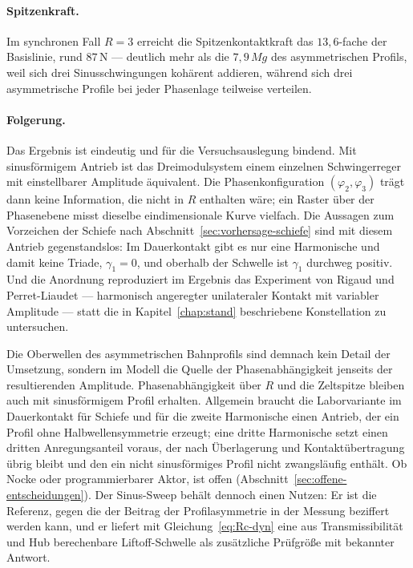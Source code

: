 \documentclass[12pt,a4paper]{report}
\begin{document}
\paragraph{Spitzenkraft.}
Im synchronen Fall $R = 3$ erreicht die Spitzenkontaktkraft das
$13{,}6$-fache der Basislinie, rund $87\,\mathrm{N}$ --- deutlich mehr
als die $7{,}9\,Mg$ des asymmetrischen Profils, weil sich drei
Sinusschwingungen kohärent addieren, während sich drei asymmetrische
Profile bei jeder Phasenlage teilweise verteilen.

\paragraph{Folgerung.}
Das Ergebnis ist eindeutig und für die Versuchsauslegung bindend. Mit
sinusförmigem Antrieb ist das Dreimodulsystem einem einzelnen
Schwingerreger mit einstellbarer Amplitude äquivalent. Die
Phasenkonfiguration $(\varphi_2, \varphi_3)$ trägt dann keine
Information, die nicht in $R$ enthalten wäre; ein Raster über der
Phasenebene misst dieselbe eindimensionale Kurve vielfach. Die
Aussagen zum Vorzeichen der Schiefe nach
Abschnitt~\ref{sec:vorhersage-schiefe} sind mit diesem Antrieb
gegenstandslos: Im Dauerkontakt gibt es nur eine Harmonische und damit
keine Triade, $\gamma_1 = 0$, und oberhalb der Schwelle ist $\gamma_1$
durchweg positiv. Und die
Anordnung reproduziert im Ergebnis das Experiment von Rigaud und
Perret-Liaudet \cite{rigaud2003} --- harmonisch angeregter unilateraler
Kontakt mit variabler Amplitude --- statt die in
Kapitel~\ref{chap:stand} beschriebene Konstellation zu untersuchen.

Die Oberwellen des asymmetrischen Bahnprofils sind demnach kein Detail
der Umsetzung, sondern im Modell die Quelle der Phasenabhängigkeit
jenseits der resultierenden Amplitude. Phasenabhängigkeit über $R$ und
die Zeltspitze bleiben auch mit sinusförmigem Profil erhalten. Allgemein
braucht die Laborvariante im Dauerkontakt für Schiefe und für die zweite
Harmonische einen Antrieb, der ein Profil ohne Halbwellensymmetrie
erzeugt; eine dritte Harmonische setzt einen dritten Anregungsanteil
voraus, der nach Überlagerung und Kontaktübertragung übrig bleibt und den
ein nicht sinusförmiges Profil nicht zwangsläufig enthält. Ob Nocke oder
programmierbarer Aktor, ist offen
(Abschnitt~\ref{sec:offene-entscheidungen}). Der Sinus-Sweep behält
dennoch einen Nutzen: Er ist die Referenz, gegen die der Beitrag der
Profilasymmetrie in der Messung beziffert werden kann, und er liefert
mit Gleichung~\eqref{eq:Rc-dyn} eine aus Transmissibilität und
Hub berechenbare Liftoff-Schwelle als zusätzliche Prüfgröße mit
bekannter Antwort.
\end{document}
